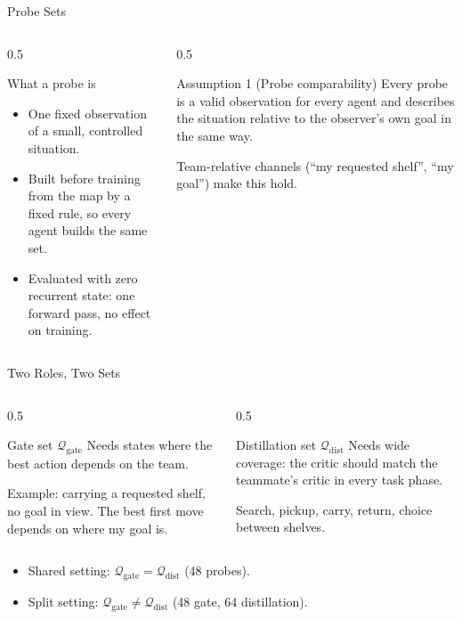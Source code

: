 \documentclass{beamer}
\begin{document}
\begin{frame}{Probe Sets}
  \begin{columns}[T]
    \begin{column}{0.5\textwidth}
      \begin{block}{What a probe is}
        \begin{itemize}
          \item One fixed observation of a small, controlled situation.
          \item Built before training from the map by a fixed rule, so every agent builds the same set.
          \item Evaluated with zero recurrent state: one forward pass, no effect on training.
        \end{itemize}
      \end{block}
    \end{column}
    \begin{column}{0.5\textwidth}
      \begin{block}{Assumption 1 (Probe comparability)}
        Every probe is a valid observation for every agent and describes the situation relative to the observer's own goal in the same way.
      \end{block}
      Team-relative channels (``my requested shelf'', ``my goal'') make this hold.
    \end{column}
  \end{columns}
\end{frame}

\begin{frame}{Two Roles, Two Sets}
  \begin{columns}[T]
    \begin{column}{0.5\textwidth}
      \begin{block}{Gate set $\mathcal{Q}_{\mathrm{gate}}$}
        Needs states where the best action depends on the team.

        \medskip
        Example: carrying a requested shelf, no goal in view. The best first move depends on where my goal is.
      \end{block}
    \end{column}
    \begin{column}{0.5\textwidth}
      \begin{block}{Distillation set $\mathcal{Q}_{\mathrm{dist}}$}
        Needs wide coverage: the critic should match the teammate's critic in every task phase.

        \medskip
        Search, pickup, carry, return, choice between shelves.
      \end{block}
    \end{column}
  \end{columns}

  \medskip
  \begin{itemize}
    \item Shared setting: $\mathcal{Q}_{\mathrm{gate}} = \mathcal{Q}_{\mathrm{dist}}$ (48 probes).
    \item Split setting: $\mathcal{Q}_{\mathrm{gate}} \neq \mathcal{Q}_{\mathrm{dist}}$ (48 gate, 64 distillation).
  \end{itemize}
\end{frame}
\end{document}

